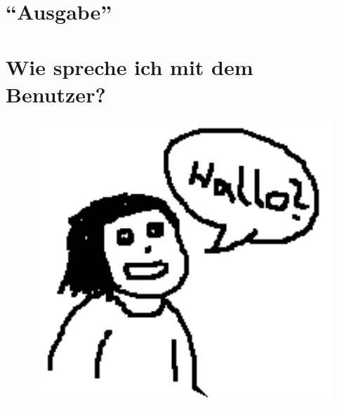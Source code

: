 



	\begin{center}
		\section*{\enquote{Ausgabe}}
		\section*{Wie spreche ich mit dem Benutzer?}	
	\end{center}

	\paragraph*{}
	\paragraph*{}
	
	\begin{figure}[htbp]
		\includegraphics[width=1\textwidth]{img/ausgabe.png}
		\label{ausgabe}
	\end{figure}
	
	\newpage
	
	
	\paragraph*{}
